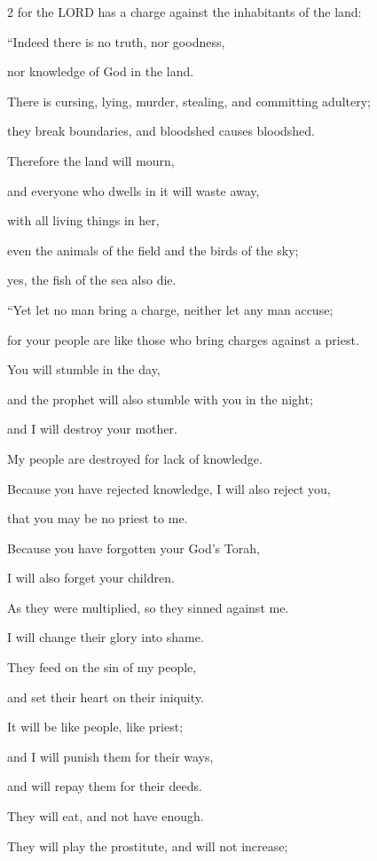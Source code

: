 \begin{multicols}{2}
for the LORD has a charge against the inhabitants of the land:

“Indeed there is no truth, nor goodness,

nor knowledge of God in the land.

\myverse{}There is cursing, lying, murder, stealing, and committing adultery;

they break boundaries, and bloodshed causes bloodshed.

\myverse{}Therefore the land will mourn,

and everyone who dwells in it will waste away,

with all living things in her,

even the animals of the field and the birds of the sky;

yes, the fish of the sea also die.


\vspace{\baselineskip} \myverse{}“Yet let no man bring a charge, neither let any man accuse;

for your people are like those who bring charges against a priest.

\myverse{}You will stumble in the day,

and the prophet will also stumble with you in the night;

and I will destroy your mother.

\myverse{}My people are destroyed for lack of knowledge.

Because you have rejected knowledge, I will also reject you,

that you may be no priest to me.

Because you have forgotten your God’s Torah,

I will also forget your children.

\myverse{}As they were multiplied, so they sinned against me.

I will change their glory into shame.

\myverse{}They feed on the sin of my people,

and set their heart on their iniquity.

\myverse{}It will be like people, like priest;

and I will punish them for their ways,

and will repay them for their deeds.

\myverse{}They will eat, and not have enough.

They will play the prostitute, and will not increase;


\end{multicols}
